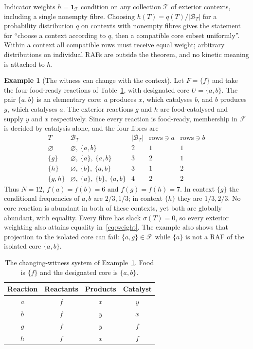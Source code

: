 \documentclass[11pt,a4paper]{article}
\theoremstyle{plain}
\theoremstyle{definition}
\newtheorem{example}[theorem]{Example}
\theoremstyle{remark}
\newcommand{\FF}{\mathcal F}
\newcommand{\BB}{\mathcal B}
\begin{document}
Indicator weights $h=\mathbf 1_{\mathcal T}$ condition on any collection $\mathcal T$ of
exterior contexts, including a single nonempty fibre. Choosing $h(T)=q(T)/|\BB_T|$ for a
probability distribution $q$ on contexts with nonempty fibres gives the statement for
``choose a context according to $q$, then a compatible core subset uniformly''. Within a
context all compatible rows must receive equal weight; arbitrary distributions on
individual RAFs are outside the theorem, and no kinetic meaning is attached to $h$.

\begin{example}[The witness can change with the context]\label{ex:switch}
Let $F=\{f\}$ and take the four food-ready reactions of Table~\ref{tab:switch}, with
designated core $U=\{a,b\}$. The pair $\{a,b\}$ is an elementary core: $a$ produces $x$,
which catalyses $b$, and $b$ produces $y$, which catalyses $a$. The exterior reactions $g$
and $h$ are food-catalysed and supply $y$ and $x$ respectively. Since every reaction is
food-ready, membership in $\FF$ is decided by catalysis alone, and the four fibres are
\[
\begin{array}{c|l|c|c|c}
T & \BB_T & |\BB_T| & \text{rows}\ni a & \text{rows}\ni b\\\hline
\varnothing & \varnothing,\ \{a,b\} & 2 & 1 & 1\\
\{g\} & \varnothing,\ \{a\},\ \{a,b\} & 3 & 2 & 1\\
\{h\} & \varnothing,\ \{b\},\ \{a,b\} & 3 & 1 & 2\\
\{g,h\} & \varnothing,\ \{a\},\ \{b\},\ \{a,b\} & 4 & 2 & 2
\end{array}
\]
Thus $N=12$, $f(a)=f(b)=6$ and $f(g)=f(h)=7$. In context $\{g\}$ the conditional
frequencies of $a,b$ are $2/3,1/3$; in context $\{h\}$ they are $1/3,2/3$. No core reaction
is abundant in both of these contexts, yet both are globally abundant, with equality.
Every fibre has slack $\sigma(T)=0$, so every exterior weighting also attains equality
in~\eqref{eq:weight}. The example also shows that projection to the isolated core can fail:
$\{a,g\}\in\FF$ while $\{a\}$ is not a RAF of the isolated core $\{a,b\}$.
\end{example}

\begin{table}[tb]\centering
\begin{tabular}{cccc}\toprule
Reaction & Reactants & Products & Catalyst\\\midrule
$a$ & $f$ & $x$ & $y$\\
$b$ & $f$ & $y$ & $x$\\
$g$ & $f$ & $y$ & $f$\\
$h$ & $f$ & $x$ & $f$\\\bottomrule
\end{tabular}
\caption{The changing-witness system of Example~\ref{ex:switch}. Food is $\{f\}$ and the designated core is $\{a,b\}$.}
\label{tab:switch}
\end{table}
\end{document}
